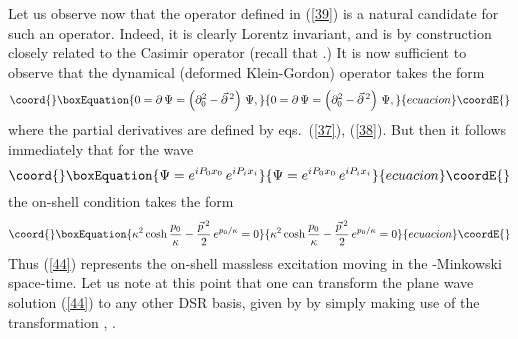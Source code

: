 \documentclass  [12pt] {article}
\def\vp{\vec{p}\, {}^2}
\begin{document}
Let us observe now that the operator \myHighlight{$\partial$}\coordHE{} defined in
(\ref{39}) is a natural candidate for such an operator. Indeed, it
is clearly Lorentz invariant, and is by construction closely
related to the Casimir operator (recall that \coordHE{}.) It is now sufficient to observe that the dynamical
(deformed Klein-Gordon) operator takes the form \cite{5dcalc3}
\begin{equation}\coord{}\boxEquation{\label{43}
 0=\partial\, \Psi = \left(\partial_0^2 - \vec{\partial}\,{}^2\right)\, \Psi,
}{0=\partial\, \Psi = \left(\partial_0^2 - \vec{\partial}\,{}^2\right)\, \Psi,
}{ecuacion}\coordE{}\end{equation}
where the partial derivatives are defined by eqs.~(\ref{37}), (\ref{38}). But
then it follows immediately that for the wave
\begin{equation}\coord{}\boxEquation{\label{44}
\Psi=e^{iP_0x_0}\, e^{iP_ix_i}
}{\Psi=e^{iP_0x_0}\, e^{iP_ix_i}
}{ecuacion}\coordE{}\end{equation}
the on-shell condition takes the form
\begin{equation}\coord{}\boxEquation{\label{45}
 \kappa^2\cosh\frac{p_0}{\kappa} - \frac{\vp}2\, e^{p_0/\kappa} =0
}{\kappa^2\cosh\frac{p_0}{\kappa} - \frac{\vp}2\, e^{p_0/\kappa} =0
}{ecuacion}\coordE{}\end{equation}
Thus (\ref{44}) represents the on-shell massless excitation moving in the
\myHighlight{$\kappa$}\coordHE{}-Mink\-owski space-time. Let us note at this point that one can
transform the plane wave solution (\ref{44}) to any other DSR basis, given by
\coordHE{} by simply making use of the transformation \coordHE{}, \coordHE{}.
\end{document}
